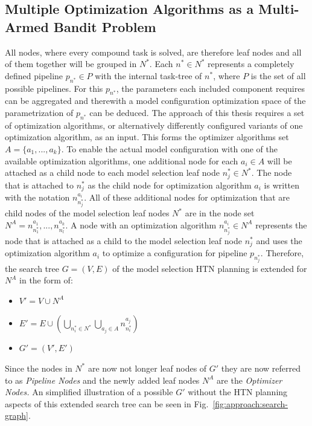 \subsection{Multiple Optimization Algorithms as a Multi-Armed Bandit Problem}
\label{sec:approach:selection:bandit}
All nodes, where every compound task is solved, are therefore leaf nodes and all of them together will be grouped in $N^*$.
Each $n^* \in N^*$ represents a completely defined pipeline $p_{n^*} \in P$ with the internal task-tree of $n^*$, where $P$ is the set of all possible pipelines.
For this $p_{n^*}$, the parameters each included component requires can be aggregated and therewith a model configuration optimization space of the parametrization of $p_{n^*}$ can be deduced.\newline
The approach of this thesis requires a set of optimization algorithms, or alternatively differently configured variants of one optimization algorithm, as an input.
This forms the optimizer algorithms set  $A = \{ a_1, ..., a_k \}$.
To enable the actual model configuration with one of the available optimization algorithms, one additional node for each $a_i \in A$ will be attached as a child node to each model selection leaf node $n^*_j \in N^*$.
The node that is attached to $n^*_j$ as the child node for optimization algorithm $a_i$ is written with the notation $n_{n^*_j}^{a_i}$.
All of these additional nodes for optimization that are child nodes of the model selection leaf nodes $N^*$ are in the node set $N^A = {n^{a_1}_{n^*_1}, ... , n^{a_k}_{n^*_l}}$.
A node with an optimization algorithm $n^{a_i}_{n^*_j} \in N^A$ represents the node that is attached as a child to the model selection leaf node $n^*_j$ and uses the optimization algorithm $a_i$ to optimize a configuration for pipeline $p_{n^*_j}$.\newline
Therefore, the search tree $G=(V, E)$ of the model selection HTN planning is extended for $N^A$ in the form of:
\begin{itemize}
    \item $V'=V \cup N^A$
    \item $E'=E \cup \left( \bigcup_{n^*_i \in N^*} \bigcup_{a_j \in A} n^{a_j}_{n^*_i} \right)$
    \item $G' = (V', E')$
\end{itemize}
Since the nodes in $N^*$ are now not longer leaf nodes of $G'$ they are now referred to as \textit{Pipeline Nodes} and the newly added leaf nodes $N^A$ are the \textit{Optimizer Nodes.}
An simplified illustration of a possible $G'$ without the HTN planning aspects of this extended search tree can be seen in Fig.~\ref{fig:approach:search-graph}.
